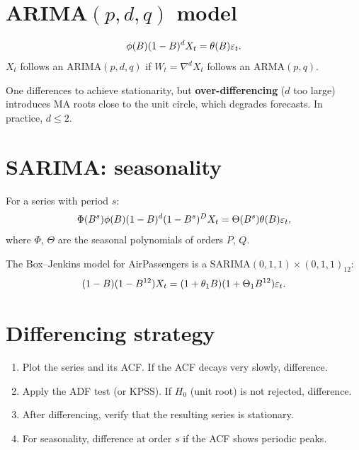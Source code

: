 \section{ARIMA$(p,d,q)$ model}

\begin{definition}[ARIMA$(p,d,q)$]
\[
\phi(B)(1-B)^d X_t = \theta(B)\varepsilon_t.
\]
$X_t$ follows an ARIMA$(p,d,q)$ if $W_t = \nabla^d X_t$ follows an ARMA$(p,q)$.
\end{definition}

\begin{warning}
One differences to achieve stationarity, but \textbf{over-differencing} ($d$ too large) introduces MA roots close to the unit circle, which degrades forecasts. In practice, $d\leq 2$.
\end{warning}

\section{SARIMA: seasonality}

\begin{definition}
For a series with period $s$:
\[
\Phi(B^s)\phi(B)(1-B)^d(1-B^s)^D X_t = \Theta(B^s)\theta(B)\varepsilon_t,
\]
where $\Phi$, $\Theta$ are the seasonal polynomials of orders $P$, $Q$.
\end{definition}

\begin{example}
The Box--Jenkins model for AirPassengers is a SARIMA$(0,1,1)\times(0,1,1)_{12}$:
\[
(1-B)(1-B^{12})X_t = (1+\theta_1 B)(1+\Theta_1 B^{12})\varepsilon_t.
\]
\end{example}

\section{Differencing strategy}

\begin{method}
\begin{enumerate}
\item Plot the series and its ACF. If the ACF decays very slowly, difference.
\item Apply the ADF test (or KPSS). If $H_0$ (unit root) is not rejected, difference.
\item After differencing, verify that the resulting series is stationary.
\item For seasonality, difference at order $s$ if the ACF shows periodic peaks.
\end{enumerate}
\end{method}

